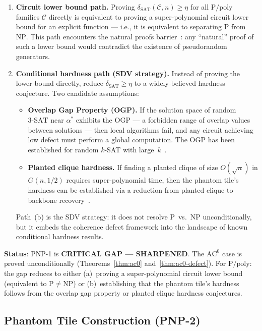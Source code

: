 \documentclass[11pt]{article}
\theoremstyle{definition}
\theoremstyle{remark}
\newcommand{\calC}{\mathcal{C}}
\newcommand{\Ppoly}{\mathrm{P/poly}}
\newcommand{\ACz}{\mathrm{AC}^0}
\newcommand{\threeSAT}{\mathrm{3\text{-}SAT}}
\newcommand{\dSAT}{\delta_{\mathrm{SAT}}}
\begin{document}
\begin{enumerate}[label=(\alph*)]
  \item \textbf{Circuit lower bound path.}  Proving $\dSAT(\calC, n) \geq \eta$
    for all $\Ppoly$ families $\calC$ directly is equivalent to proving a
    super-polynomial circuit lower bound for an explicit function ---
    i.e., it is equivalent to separating $\mathrm{P}$ from $\mathrm{NP}$.
    This path encounters the natural proofs barrier~\cite{RR}: any
    ``natural'' proof of such a lower bound would contradict the existence
    of pseudorandom generators.

  \item \textbf{Conditional hardness path (SDV strategy).}  Instead of
    proving the lower bound directly, reduce $\dSAT \geq \eta$ to a
    widely-believed hardness conjecture.  Two candidate assumptions:
    \begin{itemize}
      \item \textbf{Overlap Gap Property (OGP).}  If the solution space of
        random $\threeSAT$ near $\alpha^*$ exhibits the OGP --- a forbidden
        range of overlap values between solutions --- then local algorithms
        fail, and any circuit achieving low defect must perform a global
        computation.  The OGP has been established for random
        $k$-SAT with large~$k$~\cite{DSS15}.
      \item \textbf{Planted clique hardness.}  If finding a planted clique
        of size $O(\sqrt{n})$ in $G(n, 1/2)$ requires super-polynomial time,
        then the phantom tile's hardness can be established via a reduction
        from planted clique to backbone recovery~\cite{planted}.
    \end{itemize}
    Path~(b) is the SDV strategy: it does not resolve P~vs.~NP
    unconditionally, but it embeds the coherence defect framework into
    the landscape of known conditional hardness results.
\end{enumerate}

\textbf{Status}: PNP-1 is \textbf{CRITICAL GAP --- SHARPENED}.
The $\ACz$ case is proved unconditionally (Theorems~\ref{thm:ac0}
and~\ref{thm:ac0-defect}).  For $\Ppoly$: the gap reduces to either
(a)~proving a super-polynomial circuit lower bound (equivalent to
$\mathrm{P} \neq \mathrm{NP}$) or (b)~establishing that the phantom
tile's hardness follows from the overlap gap property or planted clique
hardness conjectures.

\subsection{Phantom Tile Construction (PNP-2)}
\end{document}
